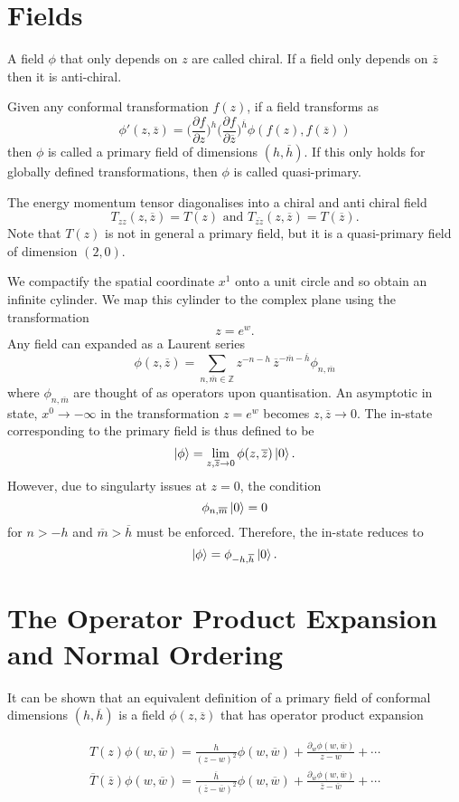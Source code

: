 \documentclass{article}
\newcommand{\Z}{\mathbb{Z}}
\begin{document}
\section{Fields}
A field $\phi$ that only depends on $z$ are called chiral. If a field only depends on $\overline{z}$ then it is anti-chiral. 

Given any conformal transformation $f(z)$, if a field transforms as $$\phi'(z,\overline{z})=\Big(\frac{\partial f}{\partial z}\Big)^h\Big(\frac{\partial f}{\partial \overline{z}}\Big)^{\overline{h}}\phi(f(z),f(\overline{z}))$$ then $\phi$ is called a primary field of dimensions $(h,\overline{h})$. If this only holds for globally defined transformations, then $\phi$ is called quasi-primary. 

The energy momentum tensor diagonalises into a chiral and anti chiral field $$T_{zz}(z,\overline{z})=T(z) \text{ and } T_{\overline{zz}}(z,\overline{z})=T(\overline{z}).$$ Note that $T(z)$ is not in general a primary field, but it is a quasi-primary field of dimension $(2,0)$. 

We compactify the spatial coordinate $x^1$ onto a unit circle and so obtain an infinite cylinder. We map this cylinder to the complex plane using the transformation $$z=e^w.$$
Any field can expanded as a Laurent series $$\phi(z,\overline{z})=\sum_{n, \overline{m} \in \Z}z^{-n-h}\,\overline{z}^{-\overline{m}-\overline{h}}\phi_{n,\overline{m}}$$ where $\phi_{n,\overline{m}}$ are thought of as operators upon quantisation. 
An asymptotic in state, $x^0 \rightarrow -\infty$ in the transformation $z=e^w$ becomes $z,\overline{z} \rightarrow 0$. The in-state corresponding to the primary field is thus defined to be $$\ket{\phi}=\lim_{z,\overline{z} \rightarrow 0}\phi(z,\overline{z})\ket{0}.$$ However, due to singularty issues at $z=0$, the condition $$\phi_{n,\overline{m}}\ket{0}=0$$ for $n>-h$ and $\overline{m}>\overline{h}$ must be enforced. Therefore, the in-state reduces to $$\ket{\phi}=\phi_{-h,\overline{h}}\ket{0}.$$

\section{The Operator Product Expansion and Normal Ordering}

It can be shown that an equivalent definition of a primary field of conformal dimensions $(h,\overline{h})$ is a field $\phi(z,\overline{z})$ that has operator product expansion 

\begin{align*}
T(z)\phi(w,\overline{w})=\frac{h}{(z-w)^2}\phi(w,\overline{w})+\frac{\partial_w\phi(w,\overline{w})}{z-w}+\cdots\\
\overline{T}(\overline{z})\phi(w,\overline{w})=\frac{\overline{h}}{(\overline{z}-\overline{w})^2}\phi(w,\overline{w})+\frac{\partial_{\overline{w}}\phi(w,\overline{w})}{\overline{z}-\overline{w}}+\cdots
\end{align*}
\end{document}
